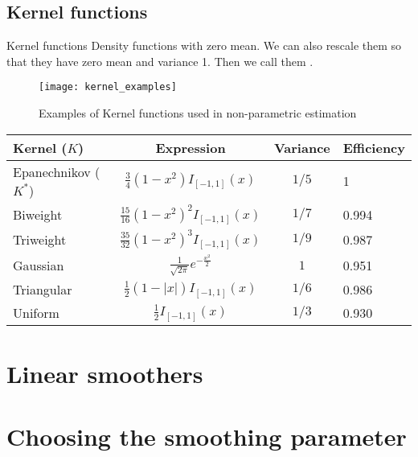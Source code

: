 \subsection{Kernel functions}

\begin{definition}{Kernel functions}{}
    Density functions with zero mean.
    \tcblower
    We can also rescale them so that they have zero mean and
    variance 1. Then we call them .
\end{definition}

\begin{figure}[H]
	\texttt{[image: kernel\_examples]}
	\caption{Examples of Kernel functions used in non-parametric estimation}
\end{figure}

\begin{table}[H]
	\begin{tabular}{lccl}
		\toprule
		Kernel ($K$)         & Expression                                & Variance & Efficiency \\
		\midrule
		Epanechnikov ($K^*$) & $\frac{3}{4}(1-x^2)I_{[-1,1]}(x)$         & $1/5$    & 1          \\
		Biweight             & $\frac{15}{16}(1-x^2)^2I_{[-1,1]}(x)$     & $1/7$    & 0.994      \\
		Triweight            & $\frac{35}{32}(1-x^2)^3I_{[-1,1]}(x)$     & $1/9$    & 0.987      \\
		Gaussian             & $\frac{1}{\sqrt{2\pi}}e^{-\frac{x^2}{2}}$ & $1$      & 0.951      \\
		Triangular           & $\frac{1}{2}(1-|x|)I_{[-1,1]}(x)$         & $1/6$    & 0.986      \\
		Uniform              & $\frac{1}{2}I_{[-1,1]}(x)$                & $1/3$    & 0.930      \\
		\bottomrule
	\end{tabular}
\end{table}

\section{Linear smoothers}
\section{Choosing the smoothing parameter}
